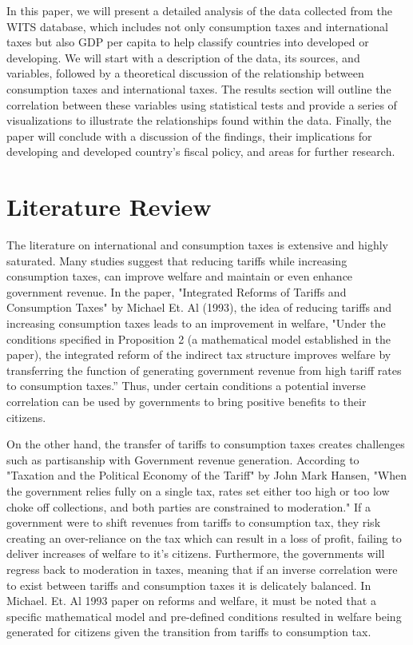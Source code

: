 \documentclass[12pt]{article}
\begin{document}
In this paper, we will present a detailed analysis of the data collected from the WITS database, which includes not only consumption taxes and international taxes but also GDP per capita to help classify countries into developed or developing. We will start with a description of the data, its sources, and variables, followed by a theoretical discussion of the relationship between consumption taxes and international taxes. The results section will outline the correlation between these variables using statistical tests and provide a series of visualizations to illustrate the relationships found within the data. Finally, the paper will conclude with a discussion of the findings, their implications for developing and developed country's fiscal policy, and areas for further research.

\section{Literature Review} \label{sec:literature}

The literature on international and consumption taxes is extensive and highly saturated. Many studies suggest that reducing tariffs while increasing consumption taxes, can improve welfare and maintain or even enhance government revenue. In the paper, "Integrated Reforms of Tariffs and Consumption Taxes" by Michael Et. Al (1993), the idea of reducing tariffs and increasing consumption taxes leads to an improvement in welfare, "Under the conditions specified in Proposition 2 (a mathematical model established in the paper), the integrated reform of the indirect tax structure improves welfare by transferring the function of generating government revenue from high tariff rates to consumption taxes.” Thus, under certain conditions a potential inverse correlation can be used by governments to bring positive benefits to their citizens. 

On the other hand, the transfer of tariffs to consumption taxes creates challenges such as partisanship with Government revenue generation.  According to "Taxation and the Political Economy of the Tariff" by John Mark Hansen, "When the government relies fully on a single tax, rates set either too high or too low choke off collections, and both parties are constrained to moderation." If a government were to shift revenues from tariffs to consumption tax, they risk creating an over-reliance on the tax which can result in a loss of profit, failing to deliver increases of welfare to it's citizens. Furthermore, the governments will regress back to moderation in taxes, meaning that if an inverse correlation were to exist between tariffs and consumption taxes it is delicately balanced. In Michael. Et. Al 1993 paper on reforms and welfare, it must be noted that a specific mathematical model and pre-defined conditions resulted in welfare being generated for citizens given the transition from tariffs to consumption tax. 
\end{document}
